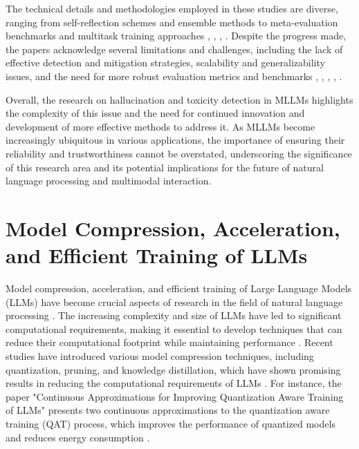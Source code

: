 \documentclass[conference]{IEEEtran}
\begin{document}
The technical details and methodologies employed in these studies are diverse, ranging from self-reflection schemes and ensemble methods to meta-evaluation benchmarks and multitask training approaches \cite{b1}, \cite{b2}, \cite{b4}, \cite{b5}. Despite the progress made, the papers acknowledge several limitations and challenges, including the lack of effective detection and mitigation strategies, scalability and generalizability issues, and the need for more robust evaluation metrics and benchmarks \cite{b1}, \cite{b2}, \cite{b3}, \cite{b4}, \cite{b5}. 

Overall, the research on hallucination and toxicity detection in MLLMs highlights the complexity of this issue and the need for continued innovation and development of more effective methods to address it. As MLLMs become increasingly ubiquitous in various applications, the importance of ensuring their reliability and trustworthiness cannot be overstated, underscoring the significance of this research area and its potential implications for the future of natural language processing and multimodal interaction.

\section{Model Compression, Acceleration, and Efficient Training of LLMs}
Model compression, acceleration, and efficient training of Large Language Models (LLMs) have become crucial aspects of research in the field of natural language processing \cite{b1}. The increasing complexity and size of LLMs have led to significant computational requirements, making it essential to develop techniques that can reduce their computational footprint while maintaining performance \cite{b2}. Recent studies have introduced various model compression techniques, including quantization, pruning, and knowledge distillation, which have shown promising results in reducing the computational requirements of LLMs \cite{b3}. For instance, the paper "Continuous Approximations for Improving Quantization Aware Training of LLMs" presents two continuous approximations to the quantization aware training (QAT) process, which improves the performance of quantized models and reduces energy consumption \cite{b4}.
\end{document}
